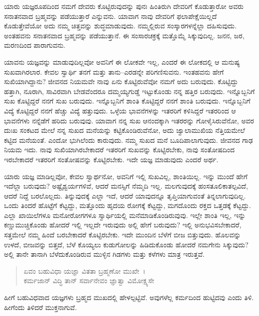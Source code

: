 ಯಾರು ಯಜ್ಞರೂಪದಿಂದ ನಮಗೆ ದೇವರು ಕೊಟ್ಟಿರುವುದನ್ನು ಪುನಃ ಹಿಂತಿರುಗಿ ದೇವರಿಗೆ ಕೊಡುತ್ತಾರೋ ಅವರು ಸನಾತನವಾದ ಬ್ರಹ್ಮವನ್ನು ಪಡೆಯುತ್ತಾರೆ ಎನ್ನುವನು. ಯಾವಾಗ ನಾವು ದೇವರಿಗೆ ಫಲಾಪೇಕ್ಷೆಯಿಲ್ಲದೆ ಕೊಡುತ್ತೇವೆಯೋ ಅದು ನಮ್ಮ ಚಿತ್ತವನ್ನು ಶುದ್ಧಮಾಡುವುದು. ನಮ್ಮಲ್ಲಿರುವ ಸಂಸ್ಕಾರಗಳನ್ನೆಲ್ಲಾ ದಹಿಸುವುದು. ಅಂತಹವನು ಸನಾತನವಾದ ಬ್ರಹ್ಮವನ್ನು ಪಡೆಯುತ್ತಾನೆ. ಈ ಸಂಸಾರಚಕ್ರಕ್ಕೆ ಮತ್ತೊಮ್ಮೆ ಸಿಕ್ಕುವುದಿಲ್ಲ. ಜನನ, ಜರ, ಮರಣದಿಂದ ಪಾರಾಗುವನು.

ಯಾವನು ಯಜ್ಞವನ್ನು ಮಾಡುವುದಿಲ್ಲವೋ ಅವನಿಗೆ ಈ ಲೋಕವೇ ಇಲ್ಲ, ಎಂದರೆ ಈ ಲೋಕದಲ್ಲಿ ಆ ಮನುಷ್ಯ ಸುಖವಾಗಿರಲಾರ. ಕೇವಲ ಸ್ವಾರ್ಥಿ ತನಗೆ ಮತ್ತು ತಾನು–ಎರಡನ್ನೇ ಪರಿಗಣಿಸುವನು. ಇಂತಹವನು ಹೇಗೆ ಸುಖಿಯಾಗಿದ್ದಾನು? ಜೀವನದ ನಿಯಮವೇ ನಾವು ಏನು ಕೊಟ್ಟಿರುವೆವೋ ನಮಗೆ ಅದು ಬರುವುದು. ಕೊಟ್ಟಿದ್ದು ಹತ್ತಾಗಿ, ನೂರಾಗಿ, ಸಾವಿರವಾಗಿ ಬೇಡವೆಂದರೂ ದಮ್ಮಯ್ಯಗುಡ್ಡೆ ಇಟ್ಟುಕೊಂಡು ನನ್ನ ಹತ್ತಿರ ಬರುವುದು. ಇನ್ನೊಬ್ಬನಿಗೆ ಸುಖ ಕೊಟ್ಟಿದ್ದರೆ ನನಗೆ ಸುಖ ಬರುವುದು. ಇನ್ನೊಬ್ಬನಿಗೆ ಶಾಂತಿ ಕೊಟ್ಟಿದ್ದರೆ ನನಗೆ ಶಾಂತಿ ಬರುವುದು. ಇನ್ನೊಬ್ಬನಿಗೆ ವಿದ್ಯೆ ಕೊಟ್ಟಿದ್ದರೆ ನನಗೆ ಹೆಚ್ಚು ವಿದ್ಯೆ ಹತ್ತುವುದು. ಒಳ್ಳೆಯ ಭಾವನೆಗಳನ್ನು ಇತರರಿಗೆ ಕಳಿಸಿದ್ದರೆ ಇತರರಿಂದ ಆ ಭಾವನೆಗಳು ನನ್ನೆಡೆಗೆ ಹರಿದು ಬರುವುವು. ಯಾವಾಗ ನನ್ನ ಸುಖ ಆನಂದಕ್ಕಾಗಿ ಇತರರನ್ನು ಗೋಳೈಸಿರುವೆನೋ, ಅವರ ದುಃಖ ಸಂಕಟದ ಮೇಲೆ ನನ್ನ ಸುಖದ ಮನೆಯನ್ನು ಕಟ್ಟಿಕೊಂಡಿರುವೆನೋ, ಅದು ಜ್ವಾಲಾಮುಖಿಯ ನೆತ್ತಿಯಮೇಲೆ ಕಟ್ಟಿದ ಮನೆಯಂತೆ. ಎಂದೋ ಭುಗಿಲೆಂದು ಕಾರುವುದು. ನಮ್ಮ ಸುಖದ ಮನೆ ಬೂದಿಪಾಲಾಗುವುದು. ಜೀವನದ ಗಾಢ ನಿಯಮ ಇದು. ನಾವು ಸುಖಿಯಾಗಿರಬೇಕಾದರೆ ಇತರರಿಗೆ ಸುಖವನ್ನು ಕೊಟ್ಟಿರಬೇಕು, ನಾವು ಸಂತೋಷದಿಂದ ಇರಬೇಕಾದರೆ ಇತರರಿಗೆ ಸಂತೋಷವನ್ನು ಕೊಟ್ಟಿರಬೇಕು. ಇದೇ ಯಜ್ಞ ಮಾಡುವುದು ಎಂದರೆ ಅರ್ಥ.

ಯಾರು ಯಜ್ಞ ಮಾಡಿಲ್ಲವೋ, ಕೇವಲ ಸ್ವಾರ್ಥನೋ, ಅವನಿಗೆ ಇಲ್ಲಿ ಸುಖವಿಲ್ಲ, ಶಾಂತಿಯಿಲ್ಲ. ಇನ್ನು ಮುಂದೆ ಹೇಗೆ ಇದೆಲ್ಲಾ ಬರುವುದು? ಅಷ್ಟೈಶ್ವರ್ಯಗಳಿವೆ, ಆದರೆ ಮನಸ್ಸಿಗೆ ನೆಮ್ಮದಿ ಇಲ್ಲ. ಮಲಗುವುದಕ್ಕೆ ಹಂಸತೂಲಿಕಾತಲ್ಪವಿದೆ, ಆದರೆ ನಿದ್ದೆ ಬರಲೊಲ್ಲದು. ತಿನ್ನುವುದಕ್ಕೆ ಎಲ್ಲಾ ಇದೆ, ಆದರೆ ಯಾವುದನ್ನೂ ತೃಪ್ತಿಯಾಗುವಂತೆ ತಿನ್ನಲಾಗುವುದಿಲ್ಲ. ಒಂದು ತಿಂದರೆ ಹೊಟ್ಟೆಗೆ ಕೆಟ್ಟದ್ದು, ಮತ್ತೊಂದು ಹೃದಯ ರೋಗಕ್ಕೆ ಕೆಟ್ಟದ್ದು, ಮಗದೊಂದು ರಕ್ತದ ಒತ್ತಡಕ್ಕೆ ಕೆಟ್ಟದ್ದು. ಎಲ್ಲಾ ಖಾಯಿಲೆಗಳೂ ಮನೋರೋಗಗಳೂ ಸ್ವಾರ್ಥಿಯಲ್ಲಿ ಮನೆಮಾಡಿಕೊಂಡಿರುವುವು. ಇಲ್ಲೇ ಶಾಂತಿ ಇಲ್ಲ, ಇನ್ನು ಕಣ್ಣುಮುಚ್ಚಿಕೊಂಡು ಹೋದರೆ ಇಲ್ಲಿ ಇಲ್ಲದೇ ಇರುವುದು ಅಲ್ಲಿ ಹೇಗೆ ಬರುವುದು? ಇಲ್ಲಿ ಅನುಭವಿಸಬೇಕಾದರೆ, ಸತ್ತಮೇಲೆ ನಮ್ಮ ಹಿಂದೆ ಬರಬೇಕಾದರೆ ಕೊಟ್ಟಿರಬೇಕು. ಇದೇ ಮುಂದಿನ ಬೆಳೆಗೆ ಬೀಜ ಬಿತ್ತುವುದು. ಹೊಲವನ್ನು ಉಳದೆ, ಬೀಜವನ್ನು ಬಿತ್ತದೆ, ಬೆಳೆ ಕೊಯ್ಯಲು ಕುಡುಗೋಲನ್ನು ಹಿಡಿದುಕೊಂಡು ಹೋದರೆ ನಮಗೇನು ಸಿಕ್ಕುವುದು? ಅಲ್ಲಿ ತಾನೇ ತಾನಾಗಿ ಬೆಳೆದುಕೊಂಡಿರುವ ಮುಳ್ಳಿನ ಗಿಡಗಳು ಮತ್ತು ಕಳೆಗಳು ಮಾತ್ರ ಇರುತ್ತವೆ.

\begin{verse}
ಏವಂ ಬಹುವಿಧಾ ಯಜ್ಞಾ ವಿತತಾ ಬ್ರಹ್ಮಣೋ ಮುಖೇ~।\\ಕರ್ಮಜಾನ್ ವಿದ್ಧಿ ತಾನ್ ಸರ್ವಾನೇವಂ ಜ್ಞಾತ್ವಾ ವಿಮೋಕ್ಷ್ಯಸೇ 
\end{verse}

{\small ಹೀಗೆ ಬಹುವಿಧವಾದ ಯಜ್ಞಗಳು ಬ್ರಹ್ಮದ ಮುಖದಲ್ಲಿ ಹೇಳಲ್ಪಟ್ಟಿವೆ. ಅವುಗಳೆಲ್ಲ ಕರ್ಮದಿಂದ ಹುಟ್ಟಿದವು ಎಂದು ತಿಳಿ. ಹೀಗೆಂದು ತಿಳಿದರೆ ಮುಕ್ತನಾಗುವೆ.}

